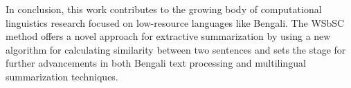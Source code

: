 \documentclass[acmlarge]{acmart}
\begin{document}
In conclusion, this work contributes to the growing body of computational linguistics research focused on low-resource languages like Bengali. The WSbSC method offers a novel approach for extractive summarization by using a new algorithm for calculating similarity between two sentences and sets the stage for further advancements in both Bengali text processing and multilingual summarization techniques.
\end{document}
